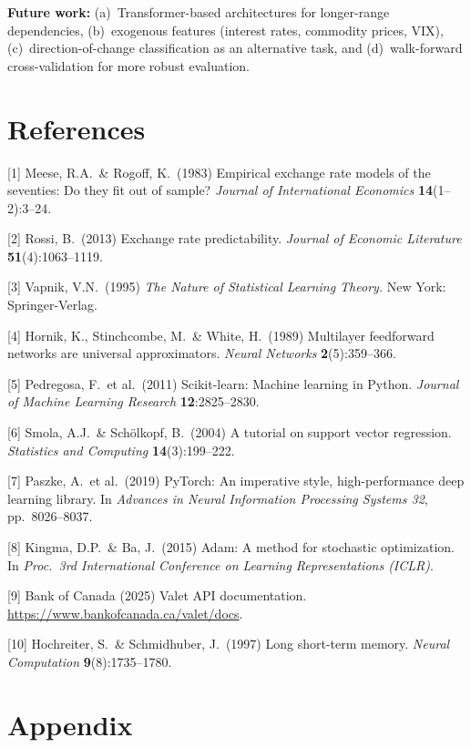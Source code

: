 \documentclass{article}
\begin{document}
\textbf{Future work:} (a)~Transformer-based architectures for longer-range dependencies, (b)~exogenous features (interest rates, commodity prices, VIX), (c)~direction-of-change classification as an alternative task, and (d)~walk-forward cross-validation for more robust evaluation.


\section*{References}

\medskip
{
\small

[1] Meese, R.A.\ \& Rogoff, K.\ (1983) Empirical exchange rate models of the seventies: Do they fit out of sample? {\it Journal of International Economics} {\bf 14}(1--2):3--24.

[2] Rossi, B.\ (2013) Exchange rate predictability. {\it Journal of Economic Literature} {\bf 51}(4):1063--1119.

[3] Vapnik, V.N.\ (1995) {\it The Nature of Statistical Learning Theory.} New York: Springer-Verlag.

[4] Hornik, K., Stinchcombe, M.\ \& White, H.\ (1989) Multilayer feedforward networks are universal approximators. {\it Neural Networks} {\bf 2}(5):359--366.

[5] Pedregosa, F.\ et al.\ (2011) Scikit-learn: Machine learning in Python. {\it Journal of Machine Learning Research} {\bf 12}:2825--2830.

[6] Smola, A.J.\ \& Sch\"olkopf, B.\ (2004) A tutorial on support vector regression. {\it Statistics and Computing} {\bf 14}(3):199--222.

[7] Paszke, A.\ et al.\ (2019) PyTorch: An imperative style, high-performance deep learning library. In {\it Advances in Neural Information Processing Systems 32}, pp.\ 8026--8037.

[8] Kingma, D.P.\ \& Ba, J.\ (2015) Adam: A method for stochastic optimization. In {\it Proc.\ 3rd International Conference on Learning Representations (ICLR)}.

[9] Bank of Canada (2025) Valet API documentation. \url{https://www.bankofcanada.ca/valet/docs}.

[10] Hochreiter, S.\ \& Schmidhuber, J.\ (1997) Long short-term memory. {\it Neural Computation} {\bf 9}(8):1735--1780.
}

\section*{Appendix}
\end{document}
